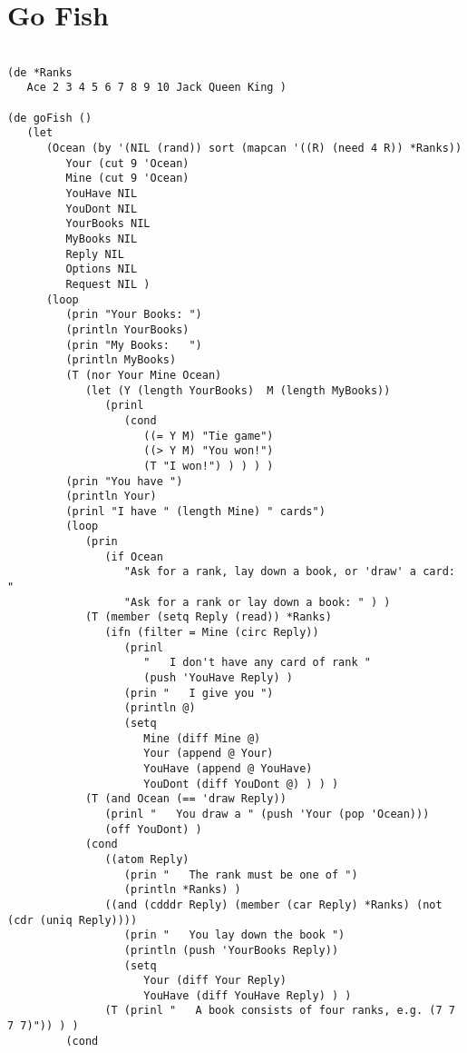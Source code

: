 \section*{Go Fish}

\begin{verbatim}

(de *Ranks
   Ace 2 3 4 5 6 7 8 9 10 Jack Queen King )

(de goFish ()
   (let
      (Ocean (by '(NIL (rand)) sort (mapcan '((R) (need 4 R)) *Ranks))
         Your (cut 9 'Ocean)
         Mine (cut 9 'Ocean)
         YouHave NIL
         YouDont NIL
         YourBooks NIL
         MyBooks NIL
         Reply NIL
         Options NIL
         Request NIL )
      (loop
         (prin "Your Books: ")
         (println YourBooks)
         (prin "My Books:   ")
         (println MyBooks)
         (T (nor Your Mine Ocean)
            (let (Y (length YourBooks)  M (length MyBooks))
               (prinl
                  (cond
                     ((= Y M) "Tie game")
                     ((> Y M) "You won!")
                     (T "I won!") ) ) ) )
         (prin "You have ")
         (println Your)
         (prinl "I have " (length Mine) " cards")
         (loop
            (prin
               (if Ocean
                  "Ask for a rank, lay down a book, or 'draw' a card: "
                  "Ask for a rank or lay down a book: " ) )
            (T (member (setq Reply (read)) *Ranks)
               (ifn (filter = Mine (circ Reply))
                  (prinl
                     "   I don't have any card of rank "
                     (push 'YouHave Reply) )
                  (prin "   I give you ")
                  (println @)
                  (setq
                     Mine (diff Mine @)
                     Your (append @ Your)
                     YouHave (append @ YouHave)
                     YouDont (diff YouDont @) ) ) )
            (T (and Ocean (== 'draw Reply))
               (prinl "   You draw a " (push 'Your (pop 'Ocean)))
               (off YouDont) )
            (cond
               ((atom Reply)
                  (prin "   The rank must be one of ")
                  (println *Ranks) )
               ((and (cdddr Reply) (member (car Reply) *Ranks) (not (cdr (uniq Reply))))
                  (prin "   You lay down the book ")
                  (println (push 'YourBooks Reply))
                  (setq
                     Your (diff Your Reply)
                     YouHave (diff YouHave Reply) ) )
               (T (prinl "   A book consists of four ranks, e.g. (7 7 7 7)")) ) )
         (cond

\end{verbatim}
